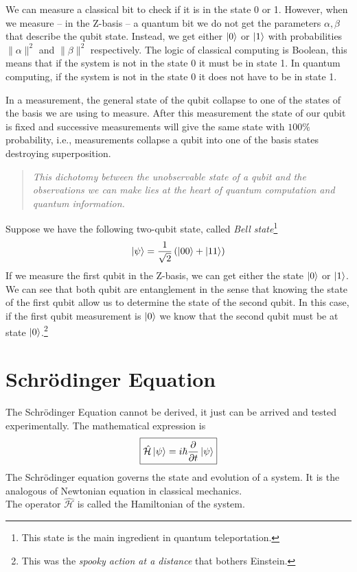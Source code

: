 \begin{flushleft}
We can measure a classical bit to check if it is in the state 0 or 1. However, when we measure -- in the Z-basis -- a quantum bit we do not get the parameters $\alpha, \beta$ that describe the qubit state. Instead, we get either $\ket{0}$ or $\ket{1}$ with probabilities $\|\alpha\|^{2}$ and $\|\beta\|^{2}$ respectively. The logic of classical computing is Boolean, this means that if the system is not in the state 0 it must be in state 1. In quantum computing, if the system is not in the state 0 it does not have to be in state 1.   
\end{flushleft}
In a measurement, the general state of the qubit collapse to one of the states of the basis we are using to measure. After this measurement the state of our qubit is fixed and successive measurements will give the same state with $100\%$ probability, i.e., measurements collapse a qubit into one of the basis states destroying superposition.
\blockquote{\textit{This dichotomy between the unobservable state of a qubit and the observations we can make lies at the heart of quantum computation and quantum information.}\\
\cite{Nielsen2010QuantumInformation}}
Suppose we have the following two-qubit state, called \textit{Bell state}\footnote{This state is the main ingredient in quantum teleportation.}
\begin{equation}
    \ket{\psi} = \frac{1}{\sqrt{2}}\left(\ket{00} + \ket{11}\right)
\end{equation}
If we measure the first qubit in the Z-basis, we can get either the state $\ket{0}$ or $\ket{1}$. We can see that both qubit are entanglement in the sense that knowing the state of the first qubit allow us to determine the state of the second qubit. In this case, if the first qubit measurement is $\ket{0}$ we know that the second qubit must be at state $\ket{0}$.\footnote{This was the \textit{spooky action at a distance} that bothers Einstein.} \\

\section{Schrödinger Equation}
The Schrödinger Equation cannot be derived, it just can be arrived and tested experimentally. The mathematical expression is
\begin{equation}
    \boxed{\hat{\mathcal{H}}\ket{\psi} = i\hbar \frac{\partial}{\partial t}\ket{\psi}}
\end{equation}
The Schrödinger equation governs the state and evolution of a system. It is the analogous of Newtonian equation in classical mechanics. \\
The operator $\hat{\mathcal{H}}$ is called the Hamiltonian of the system. 
